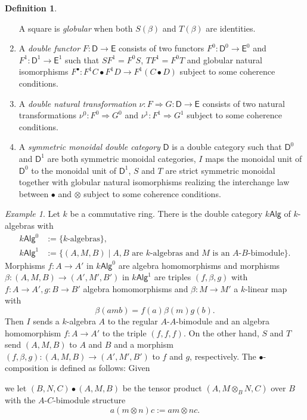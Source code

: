 \documentclass[11pt]{report}
\theoremstyle{definition}
\newtheorem{definition}[theorem]{Definition}
\theoremstyle{remark}
\theoremstyle{remark}
\newtheorem*{example}{Example}
\begin{document}
\begin{definition}
\begin{enumerate}[label=(\roman*)]
\begin{center}
\end{center}
A square is \emph{globular} when both $S(\beta)$ and $T(\beta)$ are identities.
\item A \emph{double functor} $F: \mathsf{D} \to \mathsf{E}$ consists of two functors $F^0: \mathsf{D}^0 \to \mathsf{E}^0$ and $F^1: \mathsf{D}^1 \to \mathsf{E}^1$ such that $SF^1 = F^0S$, $TF^1 = F^0T$ and globular natural isomorphisms $F^\bullet: F^1 C \bullet F^1 D \to F^1(C \bullet D)$ subject to some coherence conditions.
\item A \emph{double natural transformation} $\nu: F \Rightarrow G: \mathsf{D} \to \mathsf{E}$ consists of two natural transformations $\nu^0: F^0 \Rightarrow G^0$ and $\nu^1: F^1 \Rightarrow G^1$ subject to some coherence conditions.
\item A \emph{symmetric monoidal double category} $\mathsf{D}$ is a double category such that $\mathsf{D}^0$ and $\mathsf{D}^1$ are both symmetric monoidal categories, $I$ maps the monoidal unit of $\mathsf{D}^0$ to the monoidal unit of $\mathsf{D}^1$, $S$ and $T$ are strict symmetric monoidal together with globular natural isomorphisms realizing the interchange law between $\bullet$ and $\otimes$ subject to some coherence conditions.
\end{enumerate}
\end{definition}

\begin{example}
Let $k$ be a commutative ring. There is the double category $k\mathsf{Alg}$ of $k$-algebras with
\begin{align*}
k\mathsf{Alg}^0 &:= \{ k\text{-algebras} \}, \\
k\mathsf{Alg}^1 &:= \{ (A,M,B) \mid A,B \text{ are } k\text{-algebras and } M \text{ is an } A\text{-}B\text{-bimodule} \}.
\end{align*}
Morphisms $f: A \to A'$ in $k\mathsf{Alg}^0$ are algebra homomorphisms and morphisms $\beta: (A,M,B) \to (A',M',B')$ in $k\mathsf{Alg}^1$ are triples $(f,\beta,g)$ with $f: A \to A', g: B \to B'$ algebra homomorphisms and $\beta: M \to M'$ a $k$-linear map with
\begin{equation*}
\beta(amb) = f(a) \beta(m) g(b).
\end{equation*}
Then $I$ sends a $k$-algebra $A$ to the regular $A$-$A$-bimodule and an algebra homomorphism $f: A \to A'$ to the triple $(f,f,f)$. On the other hand, $S$ and $T$ send $(A,M,B)$ to $A$ and $B$ and a morphism $(f,\beta,g): (A,M,B) \to (A',M',B')$ to $f$ and $g$, respectively. The $\bullet$-composition is defined as follows: Given
\begin{center}
\end{center}
we let $(B,N,C) \bullet (A,M,B)$ be the tensor product $(A,M \otimes_B N,C)$ over $B$ with the $A$-$C$-bimodule structure
\begin{equation*}
a(m \otimes n)c := am \otimes nc.
\end{equation*}
\end{example}
\end{document}
